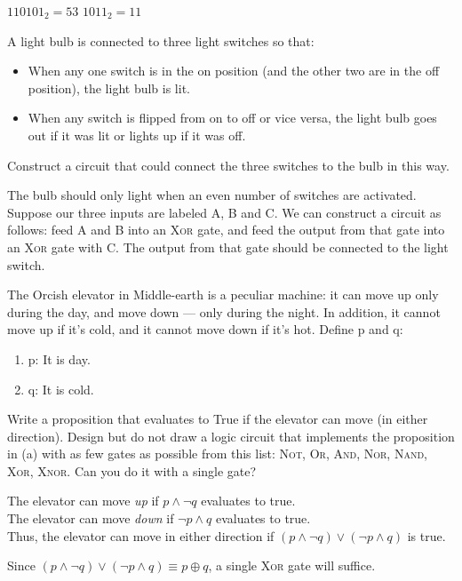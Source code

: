 \documentclass[solution, letterpaper]{cs20inclass}
\begin{document}
\begin{solution}
\subsolution $110101_2 = 53$
\subsolution $1011_2 = 11$
\end{solution}


\problem
A light bulb is connected to three light switches so that:
  \begin{itemize}
    \item When any one switch is in the on position (and the other two are in the off position), the light bulb is lit.
    \item When any switch is flipped from on to off or vice versa, the light bulb goes out if it was lit or lights up if it was off.
  \end{itemize}
Construct a circuit that could connect the three switches to the bulb in this way.

\begin{solution}

The bulb should only light when an even number of switches are activated. Suppose our three inputs are labeled A, B and C. We can construct a circuit as follows: feed A and B into an \textsc{Xor} gate, and feed the output from that gate into an \textsc{Xor} gate with C. The output from that gate should be connected to the light switch.
\end{solution}

\problem The Orcish elevator in Middle-earth is a peculiar machine: it can move up only during the day, and move down --- only during the night. In addition, it cannot move up if it's cold, and it cannot move down if it's hot. Define p and q:

\begin{enumerate}
\item p: It is day.
\item q: It is cold.
\end{enumerate}

\subproblem Write a proposition that evaluates to True if the elevator can move (in either direction).  
\subproblem Design but do not draw a logic circuit that implements the proposition in (a) with as few gates as possible from this list: \textsc{Not}, \textsc{Or}, \textsc{And}, \textsc{Nor}, \textsc{Nand}, \textsc{Xor}, \textsc{Xnor}. Can you do it with a single gate?

\begin{solution}
\subsolution
    The elevator can move \emph{up} if $p \land \lnot q$ evaluates to true. \\
    The elevator can move \emph{down} if $\lnot p \land q$ evaluates to true. \\
    Thus, the elevator can move in either direction if $(p \land \lnot q) \lor (\lnot p \land q)$ is true.
    
\subsolution Since $(p \land \lnot q) \lor (\lnot p \land q) \equiv p \oplus q$, a single \textsc{Xor} gate will suffice.

\end{solution}
\end{document}
